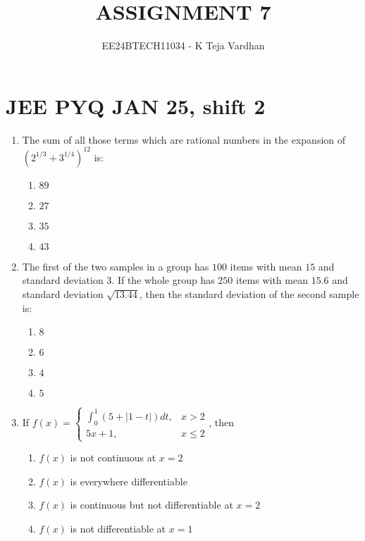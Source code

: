 \documentclass[journal]{IEEEtran}
\newcommand{\brak}[1]{\left( #1 \right)}
\newcommand{\abs}[1]{\left| #1 \right|}
\newcommand{\gt}{>}
\begin{document}

\title{ASSIGNMENT 7}
\author{EE24BTECH11034 - K Teja Vardhan}
{\let\newpage\relax\maketitle}

\section{JEE PYQ JAN 25, shift 2}
\begin{enumerate}

    \item The sum of all those terms which are rational numbers in the expansion of $\brak{2^{1/3}+3^{1/4}}^{12}$ is:

        \begin{multicols}{4}
        \begin{enumerate}
        \item $89$
        \item $27$
        \item $35$
        \item $43$
        \end{enumerate}
        \end{multicols}
        
    \item The first of the two samples in a group has $100$ items with mean $15$ and standard deviation $3$. If the whole group has $250$ items with mean $15.6$ and standard deviation $\sqrt{13.44}$, then the standard deviation of the second sample is:

        \begin{multicols}{4}
        \begin{enumerate}
        \item $8$
        \item $6$
        \item $4$
        \item $5$
        \end{enumerate}
        \end{multicols}
        
    \item If $f\brak{x}=\begin{cases}\int_{0}^{1}\brak{5+\abs{1-t}}dt,&x\gt2\\ 5x+1,&x\le2\end{cases}$, then

        \begin{enumerate}
        \item $f\brak{x}$ is not continuous at $x=2$
        \item $f\brak{x}$ is everywhere differentiable
        \item $f\brak{x}$ is continuous but not differentiable at $x=2$
        \item $f\brak{x}$ is not differentiable at $x=1$
        \end{enumerate}
    

\end{enumerate}
\end{document}
